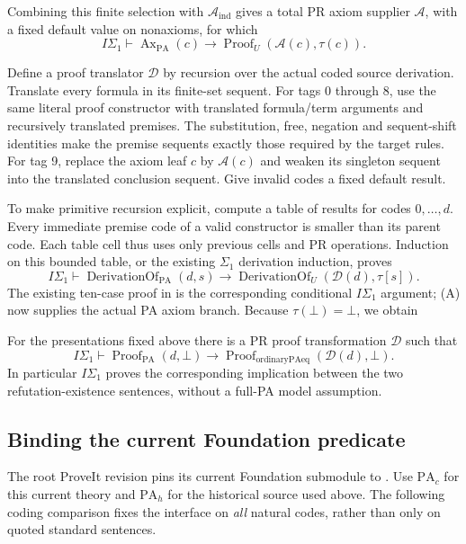 Combining this finite selection with $\mathcal A_{\mathrm{ind}}$ gives
a total PR axiom supplier $\mathcal A$, with a fixed default value on
nonaxioms, for which
\[
 I\Sigma_1\vdash
 \operatorname{Ax}_{\mathrm{PA}}(c)
 \longrightarrow \operatorname{Proof}_U(\mathcal A(c),\tau(c)). \tag{A}
\]

Define a proof translator $\mathcal D$ by recursion over the actual coded
source derivation.  Translate every formula in its finite-set sequent.
For tags 0 through 8, use the same literal proof constructor with
translated formula/term arguments and recursively translated premises.
The substitution, free, negation and sequent-shift identities make the
premise sequents exactly those required by the target rules.  For tag 9,
replace the axiom leaf $c$ by $\mathcal A(c)$ and weaken its singleton
sequent into the translated conclusion sequent.  Give invalid codes a
fixed default result.

To make primitive recursion explicit, compute a table of results for
codes $0,\ldots,d$.  Every immediate premise code of a valid constructor
is smaller than its parent code.  Each table cell thus uses only previous
cells and PR operations.  Induction on this bounded table, or the
existing $\Sigma_1$ derivation induction, proves
\[
 I\Sigma_1\vdash
 \operatorname{DerivationOf}_{\mathrm{PA}}(d,s)
 \longrightarrow
 \operatorname{DerivationOf}_{U}(\mathcal D(d),\tau[s]).   \tag{D}
\]
The existing ten-case proof in
is the corresponding conditional $I\Sigma_1$ argument; (A) now supplies
the actual PA axiom branch.  Because $\tau(\bot)=\bot$, we obtain
\begin{theorem}
For the presentations fixed above there is a PR proof transformation
$\mathcal D$ such that
\[
 I\Sigma_1\vdash
 \operatorname{Proof}_{\mathrm{PA}}(d,\bot)
 \longrightarrow \operatorname{Proof}_{\mathrm{ordinaryPAeq}}(\mathcal D(d),\bot).
\]
In particular $I\Sigma_1$ proves the corresponding implication between
the two refutation-existence sentences, without a full-PA model assumption.
\end{theorem}

\subsection{Binding the current Foundation predicate}
\label{sec:current-foundation-adapter}

The root ProveIt revision pins its current Foundation submodule to
.
Use $\mathrm{PA}_c$ for this current theory and $\mathrm{PA}_h$ for the
historical source used above.  The following coding comparison fixes
the interface on \emph{all} natural codes, rather than only on quoted
standard sentences.


